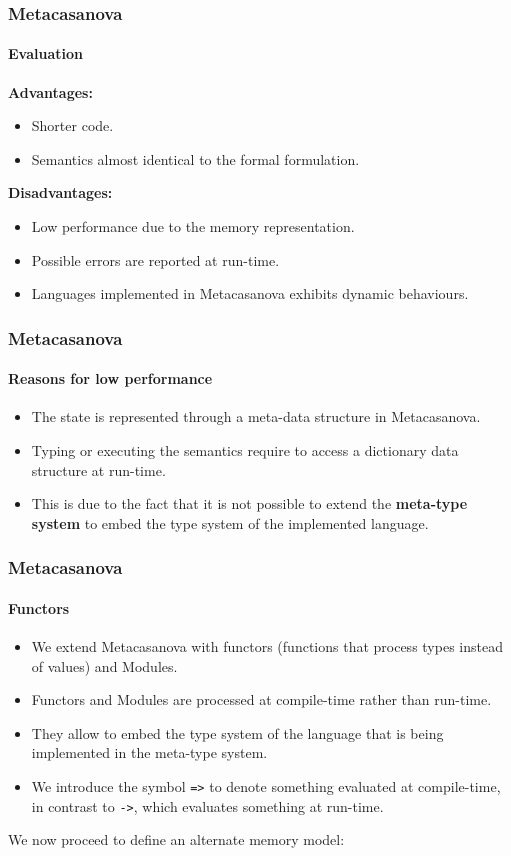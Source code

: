\documentclass[10pt,a4paper]{beamer}
\begin{document}
\begin{frame}
\frametitle{Metacasanova}
\framesubtitle{Evaluation}

\textbf{Advantages:}
\begin{itemize}
	\item Shorter code.
	\item Semantics almost identical to the formal formulation.
\end{itemize}

\textbf{Disadvantages:}
\begin{itemize}
	\item Low performance due to the memory representation.
	\item Possible errors are reported at run-time.
	\item Languages implemented in Metacasanova exhibits dynamic behaviours.
\end{itemize}
\end{frame}

\begin{frame}
\frametitle{Metacasanova}
\framesubtitle{Reasons for low performance}

\begin{itemize}
	\item The state is represented through a meta-data structure in Metacasanova.
	\item Typing or executing the semantics require to access a dictionary data structure at run-time.
	\item This is due to the fact that it is not possible to extend the \textbf{meta-type system} to embed the type system of the implemented language.
\end{itemize}
\end{frame}

\begin{frame}
\frametitle{Metacasanova}
\framesubtitle{Functors}

\begin{itemize}
	\item We extend Metacasanova with functors (functions that process types instead of values) and Modules.
	\item Functors and Modules are processed at compile-time rather than run-time.
	\item They allow to embed the type system of the language that is being implemented in the meta-type system.
	\item We introduce the symbol \texttt{=>} to denote something evaluated at compile-time, in contrast to \texttt{->}, which evaluates something at run-time.
\end{itemize}

We now proceed to define an alternate memory model:
\end{frame}
\end{document}

